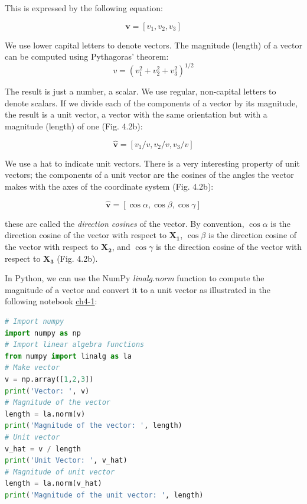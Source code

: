 \documentclass[a4paper , 12pt]{book}
\begin{document}
This is expressed by the following equation:

\begin{equation}
    \mathbf{v} = [v_1,v_2,v_3]
\end{equation}

We use lower capital letters to denote vectors. The magnitude (length) of a vector can be computed using Pythagoras' theorem:
\begin{equation}
    v = (v_1^2+v_2^2+v_3^2)^{1/2}
\end{equation}

The result is just a number, a scalar. We use regular, non-capital letters to denote scalars. If we divide each of the components of a vector by its magnitude, the result is a unit vector, a vector with the same orientation but with a magnitude (length) of one (Fig. 4.2b):

\begin{equation}
    \mathbf{\hat{v}}=[v_1/v,v_2/v,v_3/v]
\end{equation}

We use a hat to indicate unit vectors. There is a very interesting property of unit vectors; the components of a unit vector are the cosines of the angles the vector makes with the axes of the coordinate system (Fig. 4.2b):

\begin{equation}
    \mathbf{\hat v} = [\cos\alpha,\cos\beta,\cos\gamma]
\end{equation}

these are called the \textit{direction cosines} of the vector. By convention, $\cos\alpha$ is the direction cosine of the vector with respect to $\mathbf{X_1}$, $\cos\beta$ is the direction cosine of the vector with respect to $\mathbf{X_2}$, and $\cos\gamma$ is the direction cosine of the vector with respect to $\mathbf{X_3}$ (Fig. 4.2b).

In Python, we can use the NumPy \textit{linalg.norm} function to compute the magnitude of a vector and convert it to a unit vector as illustrated in the following notebook \href{https://github.com/nfcd/compGeo/blob/master/source/notebooks/ch4-1.ipynb}{ch4-1}:

\begin{center}
\begin{lstlisting}[language=Python, frame=single]
# Import numpy
import numpy as np
# Import linear algebra functions
from numpy import linalg as la
# Make vector
v = np.array([1,2,3])
print('Vector: ', v)
# Magnitude of the vector
length = la.norm(v) 
print('Magnitude of the vector: ', length)
# Unit vector
v_hat = v / length
print('Unit Vector: ', v_hat)
# Magnitude of unit vector
length = la.norm(v_hat) 
print('Magnitude of the unit vector: ', length)
\end{lstlisting}
\end{center}
\end{document}
